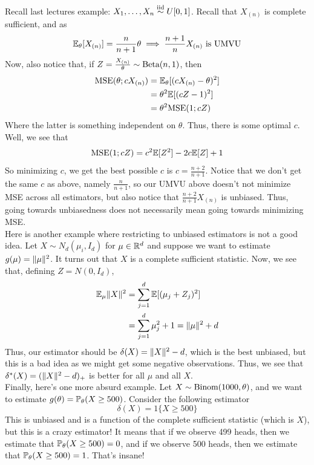 
Recall last lectures example: $X_1, \ldots, X_n \iidsim U[0, 1]$. Recall that $X_{(n)}$ is complete sufficient, and as
\[ \bb{E}_{\theta}[X_{(n)}] = \frac{n}{n + 1}\theta \implies \frac{n + 1}{n}X_{(n)} \text{ is UMVU} \]
Now, also notice that, if $Z = \frac{X_{(n)}}{\theta} \sim \tt{Beta}(n, 1)$, then
\begin{align*}
    \tt{MSE}(\theta; cX_{(n)}) &= \bb{E}_{\theta}[(cX_{(n)} - \theta)^2]\\
    &= \theta^2\bb{E}[(cZ - 1)^2]\\
    &= \theta^2\tt{MSE}(1; cZ)
\end{align*}
Where the latter is something independent on $\theta$. Thus, there is some optimal $c$. Well, we see that
\begin{align*}
    \tt{MSE}(1; cZ) = c^2\bb{E}[Z^2] - 2c \bb{E}[Z] + 1
\end{align*}
So minimizing $c$, we get the best possible $c$ is $c = \frac{n + 2}{n + 1}$. Notice that we don't get the same $c$ as above, namely $\frac{n}{n + 1}$, so our UMVU above doesn't not minimize MSE across all estimators, but also notice that $\frac{n + 2}{n + 1}X_{(n)}$ is unbiased. Thus, going towards unbiasedness does not necessarily mean going towards minimizing MSE.\\

Here is another example where restricting to unbiased estimators is not a good idea. Let $X \sim N_{d}(\mu_i, I_{d})$ for $\mu \in \R^{d}$ and suppose we want to estimate $g(\mu) = \norm{\mu}^2$. It turns out that $X$ is a complete sufficient statistic. Now, we see that, defining $Z = N(0, I_{d})$, 
\begin{align*}
    \bb{E}_{\mu}\norm{X}^2 &= \sum_{j = 1}^{d} \bb{E}[(\mu_{j} + Z_{j})^2] \\
    &= \sum_{j = 1}^{d} \mu_j^2 + 1 = \norm{\mu}^2 + d
\end{align*}
Thus, our estimator should be $\delta(X) = \norm{X}^2 - d$, which is the best unbiased, but this is a bad idea as we might get some negative observations. Thus, we see that $\delta^{*}(X) = (\norm{X}^2 - d)_{+}$ is better for all $\mu$ and all $X$.\\

Finally, here's one more absurd example. Let $X \sim \Binom(1000, \theta)$, and we want to estimate $g(\theta) = \bb{P}_{\theta}(X \geq 500)$. Consider the following estimator
\[ \delta(X) = 1\{X \geq 500\} \]
This is unbiased and is a function of the complete sufficient statistic (which is $X$), but this is a crazy estimator! It means that if we observe 499 heads, then we estimate that $\bb{P}_{\theta}(X \geq 500) = 0$, and if we observe 500 heads, then we estimate that $\bb{P}_{\theta}(X \geq 500) = 1$. That's insane!\\

